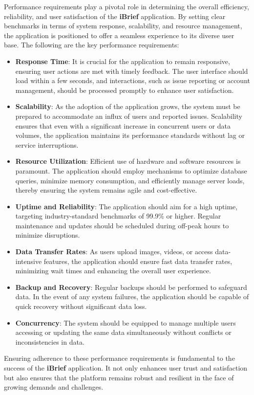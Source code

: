 Performance requirements play a pivotal role in determining the overall efficiency, reliability, and user satisfaction of the \textbf{iBrief} application. By setting clear benchmarks in terms of system response, scalability, and resource management, the application is positioned to offer a seamless experience to its diverse user base. The following are the key performance requirements:

\begin{itemize}
    \item \textbf{Response Time}: It is crucial for the application to remain responsive, ensuring user actions are met with timely feedback. The user interface should load within a few seconds, and interactions, such as issue reporting or account management, should be processed promptly to enhance user satisfaction.
    
    \item \textbf{Scalability}: As the adoption of the application grows, the system must be prepared to accommodate an influx of users and reported issues. Scalability ensures that even with a significant increase in concurrent users or data volumes, the application maintains its performance standards without lag or service interruptions.
    
    \item \textbf{Resource Utilization}: Efficient use of hardware and software resources is paramount. The application should employ mechanisms to optimize database queries, minimize memory consumption, and efficiently manage server loads, thereby ensuring the system remains agile and cost-effective.
    
    \item \textbf{Uptime and Reliability}: The application should aim for a high uptime, targeting industry-standard benchmarks of 99.9\% or higher. Regular maintenance and updates should be scheduled during off-peak hours to minimize disruptions.
    
    \item \textbf{Data Transfer Rates}: As users upload images, videos, or access data-intensive features, the application should ensure fast data transfer rates, minimizing wait times and enhancing the overall user experience.
    
    \item \textbf{Backup and Recovery}: Regular backups should be performed to safeguard data. In the event of any system failures, the application should be capable of quick recovery without significant data loss.
    
    \item \textbf{Concurrency}: The system should be equipped to manage multiple users accessing or updating the same data simultaneously without conflicts or inconsistencies in data.
\end{itemize}

Ensuring adherence to these performance requirements is fundamental to the success of the \textbf{iBrief} application. It not only enhances user trust and satisfaction but also ensures that the platform remains robust and resilient in the face of growing demands and challenges.
